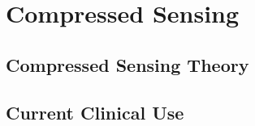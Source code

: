     \section{Compressed Sensing}
        
        \subsection{Compressed Sensing Theory}
        
        \subsection{Current Clinical Use}
        
        \subsection{}